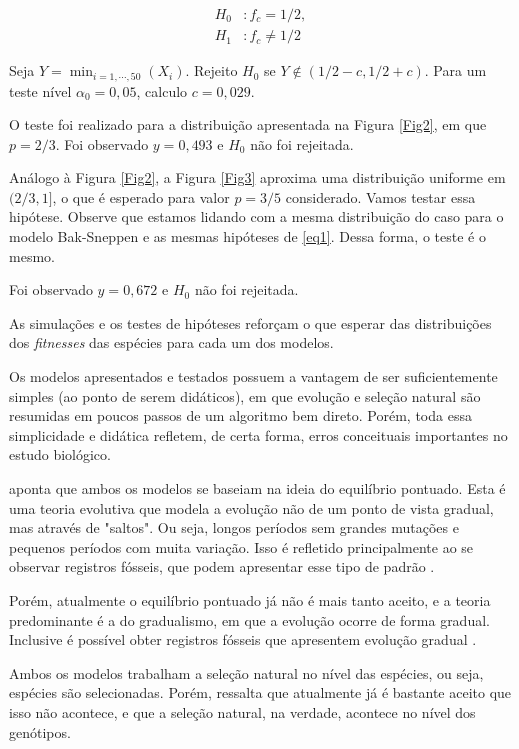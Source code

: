 \documentclass[10pt,brazil,english]{article}
\begin{document}
        \begin{equation}
            \label{eq2}
            \begin{aligned}
                H_0&: f_c = 1/2, \\
                H_1&: f_c \neq 1/2
            \end{aligned}
        \end{equation}

        Seja $Y = \min_{i = 1, \cdots, 50}(X_i)$. Rejeito $H_0$ se $Y \notin (1/2 - c, 1/2 + c)$.
        Para um teste nível $\alpha_0 = 0,05$, calculo $c = 0,029$.

        O teste foi realizado para a distribuição apresentada na Figura \ref{Fig2}, em que $p = 2/3$.
        Foi observado $y = 0,493$ e $H_0$ não foi rejeitada.

        Análogo à Figura \ref{Fig2}, a Figura \ref{Fig3} aproxima uma distribuição uniforme em $(2/3, 1]$, o que é esperado para valor $p = 3/5$ considerado.
        Vamos testar essa hipótese.
        Observe que estamos lidando com a mesma distribuição do caso para o modelo Bak-Sneppen e as mesmas hipóteses de \ref{eq1}.
        Dessa forma, o teste é o mesmo.

        Foi observado $y = 0,672$ e $H_0$ não foi rejeitada.

        As simulações e os testes de hipóteses reforçam o que esperar das distribuições dos \textit{fitnesses} das espécies para cada um dos modelos.

        Os modelos apresentados e testados possuem a vantagem de ser suficientemente simples (ao ponto de serem didáticos), em que evolução e seleção natural são resumidas em poucos passos de um algoritmo bem direto.
        Porém, toda essa simplicidade e didática refletem, de certa forma, erros conceituais importantes no estudo biológico.

         aponta que ambos os modelos se baseiam na ideia do equilíbrio pontuado.
        Esta é uma teoria evolutiva que modela a evolução não de um ponto de vista gradual, mas através de "saltos".
        Ou seja, longos períodos sem grandes mutações e pequenos períodos com muita variação.
        Isso é refletido principalmente ao se observar registros fósseis, que podem apresentar esse tipo de padrão \cite{khouri2013estudos}.

        Porém, atualmente o equilíbrio pontuado já não é mais tanto aceito, e a teoria predominante é a do gradualismo, em que a evolução ocorre de forma gradual.
        Inclusive é possível obter registros fósseis que apresentem evolução gradual \cite{khouri2013estudos}.

        Ambos os modelos trabalham a seleção natural no nível das espécies, ou seja, espécies são selecionadas.
        Porém,  ressalta que atualmente já é bastante aceito que isso não acontece, e que a seleção natural, na verdade, acontece no nível dos genótipos.

    
    
\end{document}
